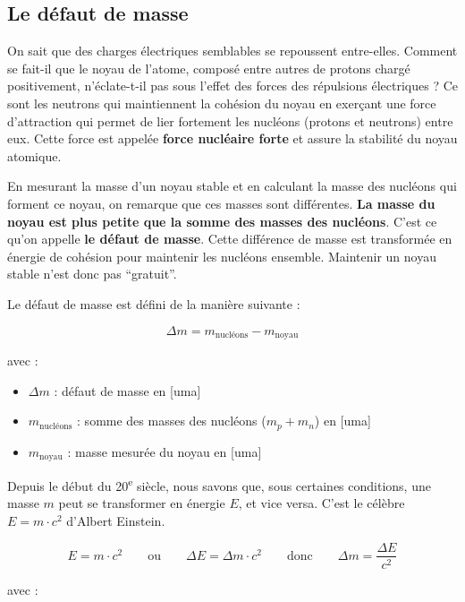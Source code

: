 \documentclass[
  11pt,
  a4paper,
  openany]{book}
\providecommand{\tightlist}{%
  \setlength{\itemsep}{0pt}\setlength{\parskip}{0pt}}
\begin{document}
\subsection{Le défaut de masse}\label{le-duxe9faut-de-masse}

On sait que des charges électriques semblables se repoussent entre-elles. Comment se fait-il que le noyau de l'atome, composé entre autres de protons chargé positivement, n'éclate-t-il pas sous l'effet des forces des répulsions électriques ? Ce sont les neutrons qui maintiennent la cohésion du noyau en exerçant une force d'attraction qui permet de lier fortement les nucléons (protons et neutrons) entre eux. Cette force est appelée \textbf{force nucléaire forte} et assure la stabilité du noyau atomique.

En mesurant la masse d'un noyau stable et en calculant la masse des nucléons qui forment ce noyau, on remarque que ces masses sont différentes. \textbf{La masse du noyau est plus petite que la somme des masses des nucléons}. C'est ce qu'on appelle \textbf{le défaut de masse}. Cette différence de masse est transformée en énergie de cohésion pour maintenir les nucléons ensemble. Maintenir un noyau stable n'est donc pas ``gratuit''.

Le défaut de masse est défini de la manière suivante :

\[
\Delta m = m_{\text{nucléons}} - m_{\text{noyau}}
\]

avec :

\begin{itemize}
\tightlist
\item
  \(\Delta m\) : défaut de masse en {[}uma{]}\\
\item
  \(m_{\text{nucléons}}\) : somme des masses des nucléons (\(m_p + m_n\)) en {[}uma{]}\\
\item
  \(m_{\text{noyau}}\) : masse mesurée du noyau en {[}uma{]}
\end{itemize}

\clearpage

Depuis le début du 20\textsuperscript{e} siècle, nous savons que, sous certaines conditions, une masse \(m\) peut se transformer en énergie \(E\), et vice versa. C'est le célèbre \(E = m \cdot c^2\) d'Albert Einstein.

\[
E = m \cdot c^2 \qquad \text{ou} \qquad \Delta E = \Delta m \cdot c^2 \qquad \text{donc} \qquad \Delta m = \frac{\Delta E}{c^2}
\]

avec :
\end{document}
